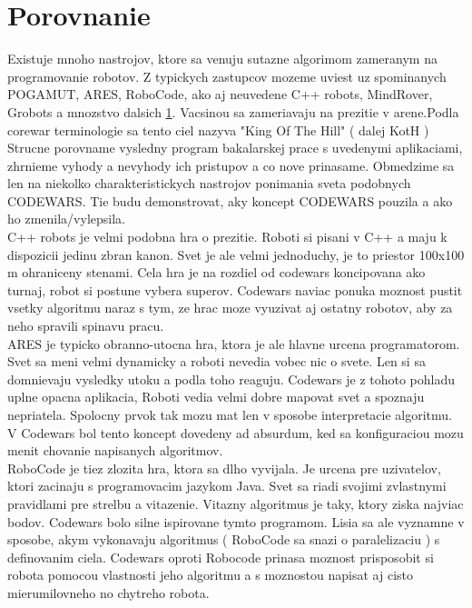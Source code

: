 \chapter{Porovnanie}
Existuje mnoho nastrojov, ktore sa venuju sutazne algorimom zameranym na programovanie robotov. Z typickych zastupcov mozeme uviest uz spominanych POGAMUT, ARES, RoboCode, ako aj neuvedene C++ robots, MindRover, Grobots a mnozstvo dalsich \ref{}. Vacsinou sa zameriavaju na prezitie v arene.Podla corewar terminologie sa tento ciel nazyva "King Of The Hill" ( dalej KotH )
\\
Strucne porovname vysledny program bakalarskej prace s uvedenymi aplikaciami, zhrnieme vyhody a nevyhody ich pristupov a co nove prinasame. Obmedzime sa len na niekolko charakteristickych nastrojov ponimania sveta podobnych CODEWARS. Tie budu demonstrovat, aky koncept  CODEWARS pouzila a ako ho zmenila/vylepsila.\\

C++ robots je velmi podobna hra o prezitie. Roboti si pisani v C++ a maju k dispozicii jedinu zbran  kanon. Svet je ale velmi jednoduchy, je to priestor 100x100 m ohraniceny stenami.  Cela hra je na rozdiel od codewars koncipovana ako turnaj, robot si postune vybera superov. %
Codewars  naviac ponuka moznost pustit vsetky algoritmu naraz s tym, ze hrac moze vyuzivat aj ostatny robotov, aby za neho spravili spinavu pracu. \\%

ARES je typicko obranno-utocna hra, ktora je ale hlavne urcena programatorom. Svet sa meni velmi dynamicky a roboti nevedia vobec nic o svete. Len si sa domnievaju vysledky utoku a podla toho reaguju. Codewars je z tohoto pohladu uplne opacna aplikacia, Roboti vedia velmi dobre mapovat svet a spoznaju nepriatela. Spolocny prvok tak mozu mat len v sposobe interpretacie algoritmu. V Codewars bol tento koncept dovedeny ad absurdum, ked sa konfiguraciou mozu menit chovanie napisanych algoritmov. \\%

RoboCode je tiez zlozita hra, ktora sa dlho vyvijala. Je urcena pre uzivatelov, ktori zacinaju s programovacim jazykom Java. Svet sa riadi svojimi zvlastnymi pravidlami pre strelbu a vitazenie. Vitazny algoritmus je taky, ktory ziska najviac bodov. Codewars bolo silne ispirovane tymto programom.  Lisia sa ale vyznamne v sposobe, akym vykonavaju algoritmus ( RoboCode sa snazi o paralelizaciu ) s definovanim ciela. Codewars oproti Robocode prinasa moznost prisposobit si robota pomocou vlastnosti jeho algoritmu a s moznostou napisat aj cisto mierumilovneho no chytreho robota.\\ %

